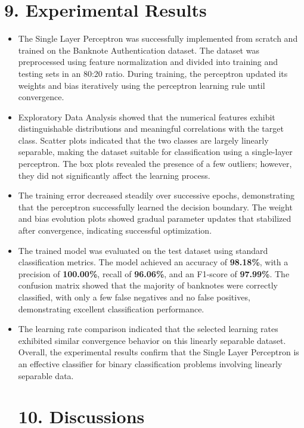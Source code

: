 \documentclass{article}
\begin{document}
\section*{9. Experimental Results}
\begin{itemize}

\item The Single Layer Perceptron was successfully implemented from scratch and trained on the Banknote Authentication dataset. The dataset was preprocessed using feature normalization and divided into training and testing sets in an 80:20 ratio. During training, the perceptron updated its weights and bias iteratively using the perceptron learning rule until convergence.


\item Exploratory Data Analysis showed that the numerical features exhibit distinguishable distributions and meaningful correlations with the target class. Scatter plots indicated that the two classes are largely linearly separable, making the dataset suitable for classification using a single-layer perceptron. The box plots revealed the presence of a few outliers; however, they did not significantly affect the learning process.


\item The training error decreased steadily over successive epochs, demonstrating that the perceptron successfully learned the decision boundary. The weight and bias evolution plots showed gradual parameter updates that stabilized after convergence, indicating successful optimization.


\item The trained model was evaluated on the test dataset using standard classification metrics. The model achieved an accuracy of \textbf{98.18\%}, with a precision of \textbf{100.00\%}, recall of \textbf{96.06\%}, and an F1-score of \textbf{97.99\%}. The confusion matrix showed that the majority of banknotes were correctly classified, with only a few false negatives and no false positives, demonstrating excellent classification performance.

\item The learning rate comparison indicated that the selected learning rates exhibited similar convergence behavior on this linearly separable dataset. Overall, the experimental results confirm that the Single Layer Perceptron is an effective classifier for binary classification problems involving linearly separable data.
\section*{10. Discussions}


\end{itemize}
\end{document}
